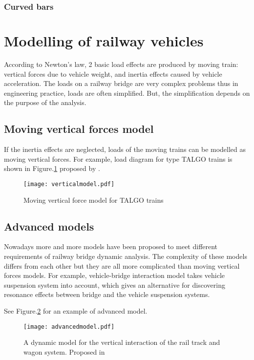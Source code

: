 \subsubsection{Curved bars}

\section{Modelling of railway vehicles}
According to Newton's law, 2 basic load effects are produced by moving train: vertical forces due to vehicle weight, and inertia effects caused by vehicle acceleration. The loads on a railway bridge are very complex problems thus in engineering practice, loads are often simplified. But, the simplification depends on the purpose of the analysis. 

\subsection{Moving vertical forces model}
If the inertia effects are neglected, loads of the moving trains can be modelled as moving vertical forces. For example, load diagram for type TALGO trains is shown in Figure.\ref{fig:verticalmodel} proposed by \cite{uic}.

\begin{figure}[h]
	\centering
	\texttt{[image: verticalmodel.pdf]}
	\caption{Moving vertical force model for TALGO trains}
	\label{fig:verticalmodel}
\end{figure}

\subsection{Advanced models}
Nowadays more and more models have been proposed to meet different requirements of railway bridge dynamic analysis. The complexity of these models differs from each other but they are all more complicated than moving vertical forces models. For example, vehicle-bridge interaction model takes vehicle suspension system into account, which gives an alternative for discovering resonance effects between bridge and the vehicle suspension systems. 

See Figure.\ref{fig:advancedmodel} for an example of advanced model.

\begin{figure}[p]
	\centering
	\texttt{[image: advancedmodel.pdf]}
	\caption{A dynamic model for the vertical interaction of the rail track and wagon system. Proposed in \cite{sun2002dynamic}}
	\label{fig:advancedmodel}
\end{figure}


